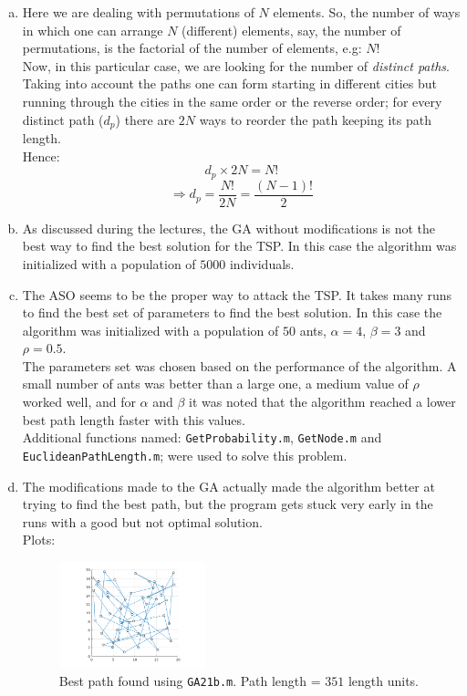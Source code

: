 \documentclass[18pt,a4paper]{article}
\begin{document}
\begin{enumerate}[a)]

	\item Here we are dealing with permutations of $N$ elements. So, the number of ways in which one can arrange $N$ (different) elements, say, the number of permutations, is the factorial of the number of elements, e.g: $N!$\\
	Now, in this particular case, we are looking for the number of {\it distinct paths}. Taking into account the paths one can form starting in different cities but running through the cities in the same order or the reverse order; for every distinct path ($d_p$) there are $2N$ ways to reorder the path keeping its path length.\\ Hence:
	$$d_p \times 2N = N!$$
	$$\Rightarrow d_p = \dfrac{N!}{2N} = \dfrac{(N - 1)!}{2}$$  
	
	\item As discussed during the lectures, the GA without modifications is not the best way to find the best solution for the TSP. In this case the algorithm was initialized with a population of $5000$ individuals.
	
	\item The ASO seems to be the proper way to attack the TSP. It takes many runs to find the best set of parameters to find the best solution. In this case the algorithm was initialized with a population of $50$ ants, $\alpha = 4$, $\beta = 3$ and $\rho = 0.5$. \\The parameters set was chosen based on the performance of the algorithm. A small number of ants was better than a large one, a medium value of $\rho$ worked well, and for $\alpha$ and $\beta$ it was noted that the algorithm reached a lower best path length faster with this values.\\
	Additional functions named: {\tt GetProbability.m}, {\tt GetNode.m} and {\tt EuclideanPathLength.m}; were used to solve this problem.
	
	\item The modifications made to the GA actually made the algorithm better at trying to find the best path, but the program gets stuck very early in the runs with a good but not optimal solution.\\
	Plots:
	
	\begin{figure}[h]
		\centering
		\includegraphics[width=0.4\textwidth]{GA21b351.png}
		\caption{\label{fig:1} Best path found using {\tt GA21b.m}. Path length = $351$ length units.}
	\end{figure}


\end{enumerate}
\end{document}
